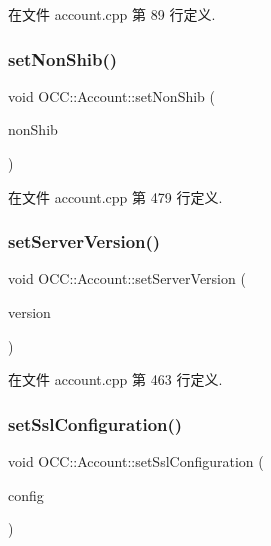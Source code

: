 在文件 account.\+cpp 第 89 行定义.

\mbox{\label{class_o_c_c_1_1_account_a38c33b5d56b774a43fbb14ab9f4589b2}} 
\subsubsection{\texorpdfstring{set\+Non\+Shib()}{setNonShib()}}
{\footnotesize\ttfamily void O\+C\+C\+::\+Account\+::set\+Non\+Shib (\begin{DoxyParamCaption}\item[{bool}]{non\+Shib }\end{DoxyParamCaption})}



在文件 account.\+cpp 第 479 行定义.

\mbox{\label{class_o_c_c_1_1_account_a7c4f3564ab4a7f8fb56c77d3ebd9f7b3}} 
\subsubsection{\texorpdfstring{set\+Server\+Version()}{setServerVersion()}}
{\footnotesize\ttfamily void O\+C\+C\+::\+Account\+::set\+Server\+Version (\begin{DoxyParamCaption}\item[{const Q\+String \&}]{version }\end{DoxyParamCaption})}



在文件 account.\+cpp 第 463 行定义.

\mbox{\label{class_o_c_c_1_1_account_ad2c51818f832c9f29ee900bc34c174f3}} 
\subsubsection{\texorpdfstring{set\+Ssl\+Configuration()}{setSslConfiguration()}}
{\footnotesize\ttfamily void O\+C\+C\+::\+Account\+::set\+Ssl\+Configuration (\begin{DoxyParamCaption}\item[{const Q\+Ssl\+Configuration \&}]{config }\end{DoxyParamCaption})}



